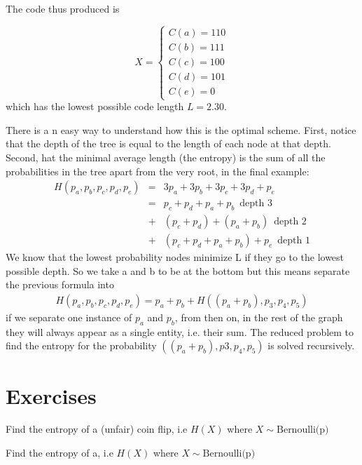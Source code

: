  The code thus produced is
 
 \begin{equation}
 X = \begin{cases}
 C(a) = 110\\
 C(b) = 111 \\
 C(c) = 100\\
 C(d) = 101 \\
 C(e) = 0
 \end{cases}
 \end{equation} 
which has the lowest possible code length $L=2.30$.

There is a n easy way to understand how this is the optimal scheme. First, notice that the depth of the tree is equal to the length of each node at that depth. Second, hat the minimal average length (the entropy) is the sum of all the probabilities in the tree apart from the very root, in the final example:
\begin{eqnarray}
H(p_a,p_b,p_c,p_d,p_e) &=& 3p_a + 3p_b + 3p_c + 3p_d + p_e\\
					   &=& p_c + p_d + p_a + p_b  \,\,\, \text{depth 3}\\
					   &+& (p_c + p_d) + (p_a + p_b) \,\,\, \text{depth 2}\\
					   &+& (p_c + p_d + p_a + p_b) + p_e \,\,\, \text{depth 1}
\end{eqnarray}
We know that the lowest probability nodes minimize L if they go to the lowest possible depth. So we take a and b to be at the bottom but this means separate the previous formula into
\begin{eqnarray}
 H(p_a,p_b,p_c,p_d,p_e) = p_a + p_b + H((p_a+p_b), p_3, p_4, p_5)
\end{eqnarray}
if we separate one instance of $p_a$ and $p_b$, from then on, in the rest of the graph they will always appear as a single entity, i.e. their sum. The reduced problem to find the entropy for the probability $((p_a+p_b), p3, p_4, p_5)$ is solved recursively.


\section{Exercises}
\begin{example}[Exercise 1]
	Find the entropy of a (unfair) coin flip, i.e $H(X)$ where $X \sim \text{Bernoulli(p)}$
\end{example}

\begin{example}[Exercise 2]
	Find the entropy of a, i.e $H(X)$ where $X \sim \text{Bernoulli(p)}$
\end{example}